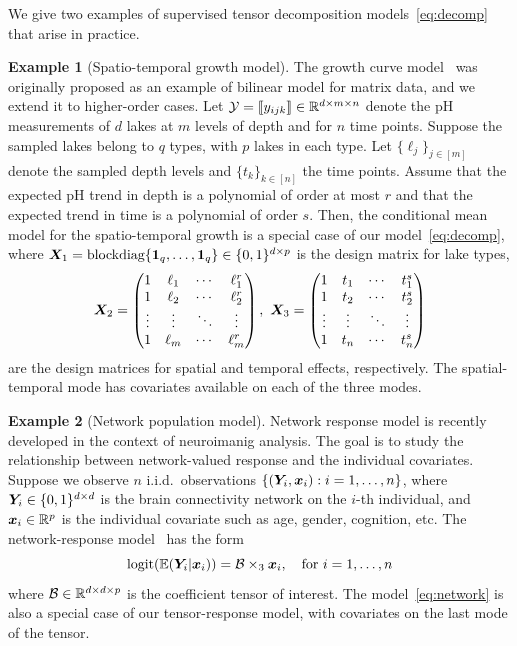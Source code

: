 \documentclass{article}
\theoremstyle{definition}
\theoremstyle{definition}
\newtheorem{example}{Example}
\begin{document}
We give two examples of supervised tensor decomposition models~\eqref{eq:decomp} that arise in practice.
\begin{example}[Spatio-temporal growth model]
The growth curve model~\citep{srivastava2008models} was originally proposed as an example of bilinear model for matrix data, and we extend it to higher-order cases. Let $\mathcal{Y}=\llbracket y_{ijk} \rrbracket\in\mathbb{R}^{d \times m\times n}$ denote the pH measurements of $d$ lakes at $m$ levels of depth and for $n$ time points. Suppose the sampled lakes belong to $q$ types, with $p$ lakes in each type. Let $\{\ell_j\}_{j\in[m]}$ denote the sampled depth levels and $\{t_k\}_{k\in[n]}$ the time points. Assume that the expected pH trend in depth is a polynomial of order at most $r$ and that the expected trend in time is a polynomial of order $s$. Then, the conditional mean model for the spatio-temporal growth is a special case of our model~\eqref{eq:decomp}, where $\bm X_1=\text{blockdiag}\{\mathbf{1}_q,\ldots,\mathbf{1}_q\}\in \{0,1\}^{d\times p}$ is the design matrix for lake types, 
\[
\bm X_2=
\begin{pmatrix}
1 & \ell_1&\cdots &\ell^{r}_1\\
1 & \ell_2&\cdots &\ell^{r}_2\\
\vdots &\vdots&\ddots&\vdots\\
1&\ell_{m}&\cdots&\ell^{r}_{m}
\end{pmatrix},\
\bm X_3=
\begin{pmatrix}
1 & t_1&\cdots &t^{s}_1\\
1 & t_2&\cdots &t^{s}_2\\
\vdots &\vdots&\ddots&\vdots\\
1&t_{n}&\cdots&t^{s}_{n}
\end{pmatrix}
\]
are the design matrices for spatial and temporal effects, respectively. The spatial-temporal mode has covariates available on each of the three modes. 

\end{example}
\begin{example}[Network population model] 
Network response model is recently developed in the context of neuroimanig analysis. The goal is to study the relationship between network-valued response and the individual covariates. Suppose we observe $n$ i.i.d.\ observations $\{(\bm Y_i, \bm x_i): i=1,\ldots,n\}$, where $\bm Y_i\in\{0,1\}^{d\times d}$ is the brain connectivity network on the $i$-th individual, and $\bm x_i\in\mathbb{R}^p$ is the individual covariate such as age, gender, cognition, etc. The network-response model~\citep{rabusseau2016low} has the form
\begin{equation}\label{eq:network}
\text{logit}(\mathbb{E}(\bm Y_i|\bm x_i))=\mathcal{B}\times_3\bm x_i, \quad \text{for }i=1,\ldots,n
\end{equation}
where $\mathcal{B}\in \mathbb{R}^{d\times d\times p}$ is the coefficient tensor of interest. The model~\eqref{eq:network} is also a special case of our tensor-response model, with covariates on the last mode of the tensor. 
\end{example}
\end{document}
